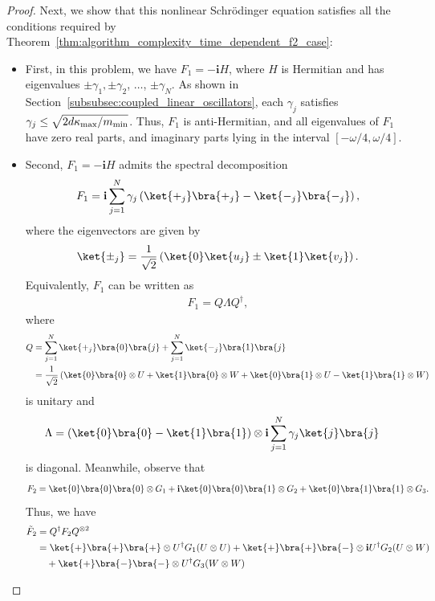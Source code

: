 \documentclass[superscriptaddress,onecolumn,nofootinbib,longbibliography,a4paper,accepted=2026-09-29]{quantumarticle}
\theoremstyle{plain}
\theoremstyle{definition}
\numberwithin{thm}{section}
\numberwithin{assumption}{section}
\numberwithin{lemma}{section}
\numberwithin{prop}{section}
\numberwithin{cor}{section}
\numberwithin{definition}{section}
\numberwithin{rmk}{section}
\numberwithin{equation}{section}
\newcommand{\lrb}[1]{\left ( #1 \right )}
\renewcommand{\i}{\ensuremath{\mathbf{i}}}
\begin{document}
\begin{proof}
Next, we show that this nonlinear Schr\"{o}dinger equation satisfies all the conditions required by Theorem~\ref{thm:algorithm_complexity_time_dependent_f2_case}:
\begin{itemize}
\item First, in this problem, we have $F_1=-\i H$, where $H$ is Hermitian and has
eigenvalues $\pm \gamma_1, \pm \gamma_2$, $\dots$, $\pm \gamma_N$. As shown in Section~\ref{subsubsec:coupled_linear_oscillators}, each $\gamma_j$ satisfies $\gamma_j\le \sqrt{2 d \kappa_{\rm max} / m_{\rm min}}$. Thus, $F_1$ is anti-Hermitian, and all eigenvalues of $F_1$ have zero real parts, and imaginary parts lying in the interval $[-\omega/4, \omega/4]$.
\item Second, $F_1=-\i H$ admits the spectral decomposition
\begin{align}
    F_1 = \i\sum_{j=1}^N \gamma_j \lrb{\ket{+_j}\bra{+_j} - \ket{-_j}\bra{-_j}},    
\end{align}
where the eigenvectors are given by
\begin{align}
    \ket{\pm_j}=\frac{1}{\sqrt{2}}\lrb{\ket{0}\ket{u_j}\pm \ket{1}\ket{v_j}}.
\end{align}
Equivalently, $F_1$ can be written as 
\begin{align}
    F_1 = Q \Lambda Q^\dagger,
\end{align}
where
\begin{align}
Q &= 
\sum_{j=1}^N \ket{+_j}\bra{0}\bra{j}
+
\sum_{j=1}^N \ket{-_j}\bra{1}\bra{j} \\
&=\frac{1}{\sqrt{2}}\lrb{\ket{0}\bra{0}\otimes U+\ket{1}\bra{0}\otimes W+\ket{0}\bra{1}\otimes U-\ket{1}\bra{1}\otimes W}
\end{align}
is unitary and
\begin{align}
\Lambda &= \lrb{\ket{0}\bra{0} - \ket{1}\bra{1}} \otimes \i 
 \sum_{j=1}^N \gamma_j \ket{j}\bra{j}        
\end{align}
is diagonal. Meanwhile, observe that
\begin{align}
F_2 = \ket{0}\bra{0}\bra{0}\otimes G_1
    +\i\ket{0}\bra{0}\bra{1}\otimes G_2
    +\ket{0}\bra{1}\bra{1}\otimes G_3.    
\end{align}
Thus, we have
\begin{align}
\tilde{F}_2 & = Q^\dagger F_2 Q^{\otimes 2} \\
&=\ket{+}\bra{+}\bra{+} \otimes U^\dagger G_1 (U \otimes U)  +\ket{+}\bra{+}\bra{-} \otimes \i U^\dagger G_2 (U \otimes W) \nonumber\\
&\quad +\ket{+}\bra{-}\bra{-} \otimes U^\dagger G_3 (W \otimes W) \\

\end{align}
\end{itemize}
\end{proof}
\end{document}
